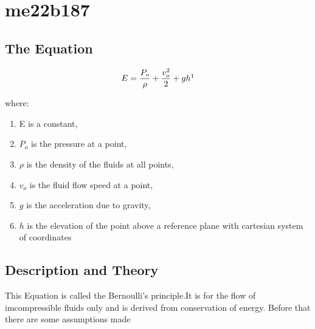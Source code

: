 %
\section{me22b187}
\subsection{The Equation}

\begin{equation}
\label{rohan}
	E=\frac{P_o}{\rho} +\frac{v^2_o}{2} + gh\footnotemark{}
\end{equation}


where:
\begin{enumerate}
	\item	E is a constant,
	\item	$ P_o $ is the pressure at a point,
	\item   $\rho$ is the density of the fluids at all points,
	\item	$ v_o $ is the fluid flow speed at a point,
	\item	$ g $ is the acceleration due to gravity,
	\item	$ h $ is the elevation of the point above a reference plane with cartesian system of coordinates
\end{enumerate}
\subsection{Description and Theory}
This Equation is called the Bernoulli's principle.It is for the flow of imcompressible fluids only and is derived from conservation of energy.
Before that there are some assumptions made
